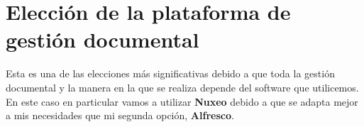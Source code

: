 \chapter{Elección de la plataforma de gestión documental}

Esta es una de las elecciones más significativas debido a que toda la gestión documental
y la manera en la que se realiza depende del software que utilicemos.
\\

En este caso en particular vamos a utilizar \textbf{Nuxeo} debido a que se adapta mejor a mis
necesidades que mi segunda opción, \textbf{Alfresco}.

